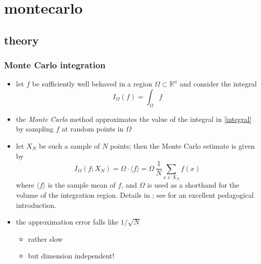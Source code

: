 %



\section{montecarlo}
\subsection{theory}

\begin{frame}
%
  \frametitle{Monte Carlo integration}
%
  \begin{itemize}
%
  \item let $f$ be sufficiently well behaved in a region $\Omega \subset \mathbb{R}^{n}$ and
    consider the integral
    \begin{equation}
      I_{\Omega} (f) = \int_{\Omega} f
      \label{eq:integral}
    \end{equation}
%
  \item the {\em Monte Carlo} method approximates the value of the integral in \eqref{integral}
    by sampling $f$ at random points in $\Omega$
%
  \item let $X_{N}$ be such a sample of $N$ points; then the Monte Carlo estimate is given by
    \begin{equation}
      I_{\Omega} (f; X_{N})
      =
      \Omega \cdot \langle f \rangle
      =
      \Omega \, \frac{1}{N} \sum_{x \in X_{N}} f(x)
      \label{eq:mc-estimate}
    \end{equation}
%
    where $\langle f \rangle$ is the sample mean of $f$, and $\Omega$ is used as a shorthand
    for the volume of the integration region. Details in \citep{hammersley,ueberhuber}; see
    \cite{weinzierl} for an excellent pedagogical introduction.
%
  \item the approximation error falls like $1/\sqrt{N}$
    \begin{itemize}
    \item rather slow
    \item but dimension independent!
    \end{itemize}
  \end{itemize}
%
\end{frame}


